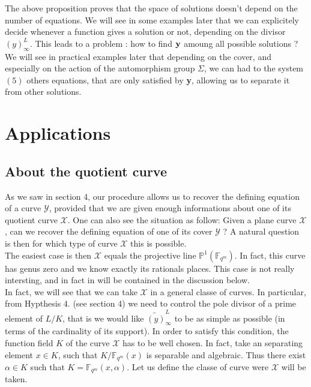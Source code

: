 \documentclass[10pt]{article}
\newcommand{\s}{\vspace{0.3cm}}
\newcommand{\PP}{\mathbb{P}}
\newcommand{\fqm}{\mathbb{F}_{q^m}}
\newcommand{\X}{\mathcal{X}}
\newcommand{\Y}{\mathcal{Y}}
\begin{document}
\s

The above proposition proves that the space of solutions doesn't depend on the number of equations. 
We will see in some examples later that we can explicitely decide whenever a function gives a solution or not, depending on the divisor $(y)^L_{\infty}$. This leads to a problem : how to find $\bf{y}$ \rm amoung all possible solutions ? We will see in practical examples later that depending on the cover, and especially on the action of the automorphism group $\Sigma$,  we can had to the system $(5)$ others equations, that are only satisfied by \textbf{y}, allowing us to separate it from other solutions.

\s
\section{Applications}

\s

\subsection{About the quotient curve}

\s


As we saw in section 4, our procedure allows us to recover the defining equation of a curve $\Y$, provided that we are given enough informations about one of its quotient curve $\X$. One can also see the situation as follow: Given a plane curve $\X$, can we recover the defining equation of one of its cover $\Y$ ? A natural question is then for which type of curve $\X$ this is possible. \\


The easiest case is then $\X$ equals the projective line $\PP^1(\fqm)$. In fact, this curve has genus zero and we know exactly its rationals places. This case is not really intersting, and in fact in will be contained in the discussion below.\\

In fact, we will see that we can take $\X$ in a general classe of curves. In particular, from Hypthesis $4.$ (see section 4) we need to control the pole divisor of a prime element of $L/K$, that is we would like $\widetilde{(y)}^L_{\infty}$ to be as simple as possible (in terms of the cardinality of its support). In order to satisfy this condition, the function field $K$ of the curve $\X$ has to be well chosen. In fact, take an separating element $x \in K$, such that $K/\fqm(x)$ is separable and algebraic. Thus there exist $\alpha \in K$ such that $K=\fqm(x,\alpha)$. Let us define the classe of curve were $\X$ will be taken.
\end{document}
